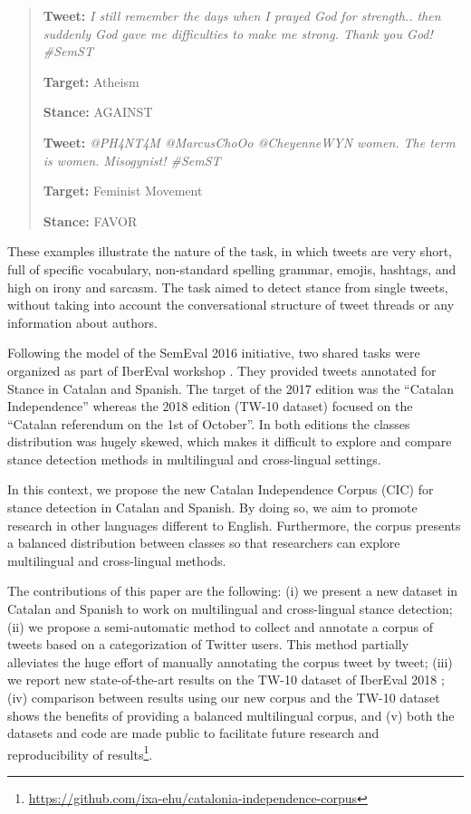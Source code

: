 \documentclass[10pt, a4paper]{article}
\begin{document}
\begin{quote}
\textbf{Tweet:} \textit{I still remember the days when I prayed God for strength.. then suddenly God gave me difficulties to make me strong. Thank you God! \#SemST}

\textbf{Target:} Atheism

\textbf{Stance:} AGAINST

\vspace{0.5cm}

\textbf{Tweet:} \textit{@PH4NT4M @MarcusChoOo @CheyenneWYN women. The term is women. Misogynist! \#SemST}

\textbf{Target:} Feminist Movement

\textbf{Stance:} FAVOR
\end{quote}

These examples illustrate the nature of the task, in which tweets are very short, full of specific vocabulary, non-standard spelling grammar, emojis, hashtags, and high on irony and sarcasm. The task aimed to detect stance from single tweets, without taking into account the conversational structure of tweet threads or any information about authors.

Following the model of the SemEval 2016 initiative, two shared tasks were organized as part of IberEval workshop \cite{taule17,taule18}. They provided tweets annotated for Stance in Catalan and Spanish. The target of the 2017 edition was the ``Catalan Independence'' whereas the 2018 edition (TW-10 dataset) focused on the ``Catalan referendum on the 1st of October''. In both editions the classes distribution was hugely skewed, which makes it difficult to explore and compare stance detection methods in multilingual and cross-lingual settings.

In this context, we propose the new Catalan Independence Corpus (CIC) for stance detection in Catalan and Spanish. By doing so, we aim to promote research in other languages different to English. Furthermore, the corpus presents a balanced distribution between classes so that researchers can explore multilingual and cross-lingual methods.

The contributions of this paper are the following: (i) we present a new dataset in Catalan and Spanish to work on multilingual and cross-lingual stance detection; (ii) we propose a semi-automatic method to collect and annotate a corpus of tweets based on a categorization of Twitter users. This method partially alleviates the huge effort of manually annotating the corpus tweet by tweet; (iii) we report new state-of-the-art results on the TW-10 dataset of IberEval 2018 \cite{taule18}; (iv) comparison between results using our new corpus and the TW-10 dataset shows the benefits of providing a balanced multilingual corpus, and (v) both the datasets and code are made public to facilitate future research and reproducibility of results\footnote{\url{https://github.com/ixa-ehu/catalonia-independence-corpus}}.
\end{document}
